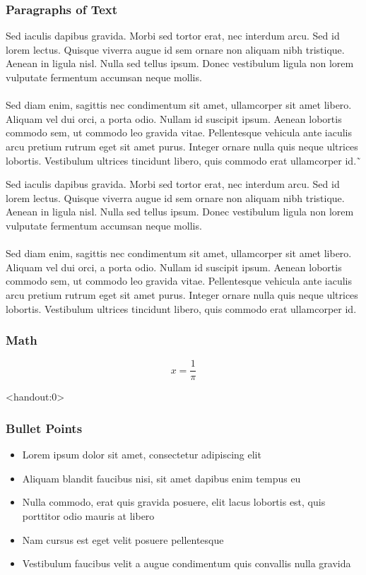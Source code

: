 \documentclass[t]{beamer}
\begin{document}
\begin{frame}[allowframebreaks]
\frametitle{Paragraphs of Text}
Sed iaculis dapibus gravida. Morbi sed tortor erat, nec interdum arcu. Sed id lorem lectus. Quisque viverra augue id sem ornare non aliquam nibh tristique. Aenean in ligula nisl. Nulla sed tellus ipsum. Donec vestibulum ligula non lorem vulputate fermentum accumsan neque mollis.\\~\\

Sed diam enim, sagittis nec condimentum sit amet, ullamcorper sit amet libero. Aliquam vel dui orci, a porta odio. Nullam id suscipit ipsum. Aenean lobortis commodo sem, ut commodo leo gravida vitae. Pellentesque vehicula ante iaculis arcu pretium rutrum eget sit amet purus. Integer ornare nulla quis neque ultrices lobortis. Vestibulum ultrices tincidunt libero, quis commodo erat ullamcorper id.\~\

Sed iaculis dapibus gravida. Morbi sed tortor erat, nec interdum arcu. Sed id lorem lectus. Quisque viverra augue id sem ornare non aliquam nibh tristique. Aenean in ligula nisl. Nulla sed tellus ipsum. Donec vestibulum ligula non lorem vulputate fermentum accumsan neque mollis.\\~\\

Sed diam enim, sagittis nec condimentum sit amet, ullamcorper sit amet libero. Aliquam vel dui orci, a porta odio. Nullam id suscipit ipsum. Aenean lobortis commodo sem, ut commodo leo gravida vitae. Pellentesque vehicula ante iaculis arcu pretium rutrum eget sit amet purus. Integer ornare nulla quis neque ultrices lobortis. Vestibulum ultrices tincidunt libero, quis commodo erat ullamcorper id.

\end{frame}


\begin{frame}[shrink]
\frametitle{Math}
\[
x = \frac{1}{\pi}
\]
\end{frame}


\begin{frame}<handout:0>
\frametitle{Bullet Points}
\begin{itemize}
\item Lorem ipsum dolor sit amet, consectetur adipiscing elit
\item Aliquam blandit faucibus nisi, sit amet dapibus enim tempus eu
\item Nulla commodo, erat quis gravida posuere, elit lacus lobortis est, quis porttitor odio mauris at libero
\item Nam cursus est eget velit posuere pellentesque
\item Vestibulum faucibus velit a augue condimentum quis convallis nulla gravida
\end{itemize}
\end{frame}
\end{document}
